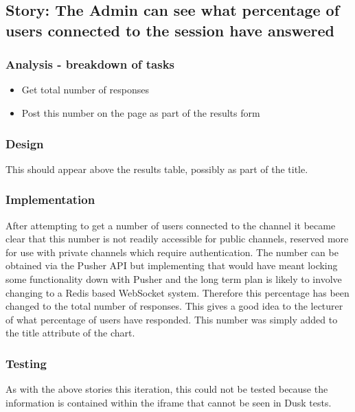 \subsection{Story: The Admin can see what percentage of users connected to the session have answered}
\subsubsection{Analysis - breakdown of tasks}
\begin{itemize}
	\item Get total number of responses
	\item Post this number on the page as part of the results form
\end{itemize}
\subsubsection{Design}
This should appear above the results table, possibly as part of the title.
\subsubsection{Implementation}
After attempting to get a number of users connected to the channel it became clear that this number is not readily accessible for public channels, reserved more for use with private channels which require authentication. The number can be obtained via the Pusher API but implementing that would have meant locking some functionality down with Pusher and the long term plan is likely to involve changing to a Redis based WebSocket system. Therefore this percentage has been changed to the total number of responses. This gives a good idea to the lecturer of what percentage of users have responded. This number was simply added to the title attribute of the chart.
\subsubsection{Testing}
As with the above stories this iteration, this could not be tested because the information is contained within the iframe that cannot be seen in Dusk tests.
\newpage
